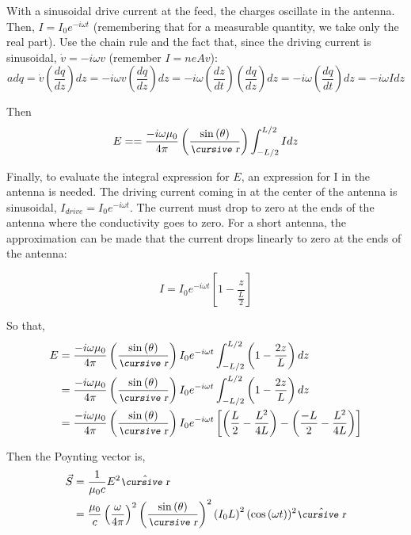 \documentclass[12pt]{article}
\begin{document}
\begin{flushleft}
With a sinusoidal drive current at the feed, the charges oscillate in the antenna.  Then, $I=I_{0}e^{-i\omega t}$ (remembering that for a measurable quantity, we take only the real part).  Use the chain rule and the fact that, since the driving current is sinusoidal, $\dot{v}=-i\omega v$  (remember $I=neAv$): 
\[
adq=\dot{v}\left( \frac{dq}{dz} \right) dz = -i\omega v  \left( \frac{dq}{dz} \right) dz= -i\omega \left(  \frac{dz}{dt} \right) \left( \frac{dq}{dz} \right) dz = - i\omega \left( \frac{dq}{dt} \right) dz = -i\omega I dz
\]
 
Then
\[
E = = \frac{ -i\omega \mu_{0} }{4\pi} \left( \frac{\sin{(\theta)}}{\text{\small\slshape\cursive r}} \right) \int_{-L/2}^{L/2}   I dz 
\]

Finally, to evaluate the integral expression for $E$, an expression for I in the antenna is needed.  The driving current coming in at the center of the antenna is sinusoidal, $I_{drive}=I_{0}e^{-i\omega t}$.  The current must drop to zero at the ends of the antenna where the conductivity goes to zero.  For a short antenna, the approximation can be made that the current drops linearly to zero at the ends of the antenna:

\[
I = I_{0}e^{-i\omega t}\left[ 1 - \frac{z}{\frac{L}{2}} \right]
\]

So that,
\begin{equation*}
\begin{aligned}
E & = \frac{ -i\omega \mu_{0} }{4\pi} \left( \frac{\sin{(\theta)}}{\text{\small\slshape\cursive r}} \right) I_{0} e^{-i\omega t } \int_{-L/2}^{L/2}   \left(1-\frac{2z}{L}\right) dz \\
 & = \frac{ -i\omega \mu_{0} }{4\pi} \left( \frac{\sin{(\theta)}}{\text{\small\slshape\cursive r}} \right) I_{0} e^{-i\omega t } \int_{-L/2}^{L/2}   \left(1-\frac{2z}{L}\right) dz \\
  & = \frac{ -i\omega \mu_{0} }{4\pi} \left( \frac{\sin{(\theta)}}{\text{\small\slshape\cursive r}} \right) I_{0} e^{-i\omega t }  \left[ \left( \frac{L}{2} - \frac{ L^{2} }{4L}  \right) -  \left( \frac{-L}{2} - \frac{ L^{2} }{4L}  \right) \right] \\
\end{aligned}
\end{equation*}

Then the Poynting vector is,
\begin{equation*}
\begin{aligned}
\vec{S} & =\frac{1}{\mu_{0}c}E^{2} \hat{\text{\small\slshape\cursive r}} \\
& = \frac{\mu_{0}}{c}\left( \frac{\omega }{4\pi } \right)^{2} \left( \frac{\sin{(\theta)}}{\text{\small\slshape\cursive r}} \right)^{2} \left( I_{0}L \right)^{2}(\cos{(\omega t)})^{2}\hat{\text{\small\slshape\cursive r}} 
\end{aligned}
\end{equation*}


\end{flushleft}
\end{document}
